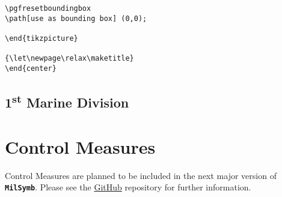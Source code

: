 \documentclass[a4paper, titlepage]{article}
\newcommand\MilSymb{\textbf{\texttt{MilSymb}}}
\newenvironment{writett}{\ttfamily}{\par}
\begin{document}
\begin{landscape}
\begin{writett}
\begin{verbatim}
\pgfresetboundingbox
\path[use as bounding box] (0,0);

\end{tikzpicture}

{\let\newpage\relax\maketitle}
\end{center}
\end{verbatim}
\end{writett}

\subsection{1\textsuperscript{st} Marine Division}



\begin{figure}[H]
\centering

\label{org}
\end{figure}

\end{landscape}

\section{Control Measures}

Control Measures are planned to be included in the next major version of \MilSymb. Please see the \href{https://github.com/ralphieraccoon/MilSymb}{GitHub} repository for further information.
\end{document}
